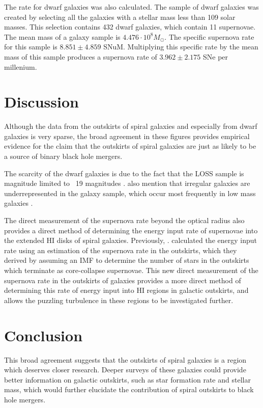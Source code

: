 \documentclass[apj]{emulateapj}
\begin{document}
The rate for dwarf galaxies was also calculated. The sample of dwarf galaxies was created by selecting all the galaxies with a stellar mass less than 109 solar masses. This selection contains 432 dwarf galaxies, which contain 11 supernovae. The mean mass of a galaxy sample is $4.476 \cdot 10^{8} M_{\odot}$. The specific supernova rate for this sample is $8.851 \pm 4.859$ SNuM. Multiplying this specific rate by the mean mass of this sample produces a supernova rate of $3.962 \pm 2.175$ SNe per millenium.

\section{Discussion}

Although the data from the outskirts of spiral galaxies and especially from dwarf galaxies is very sparse, the broad agreement in these figures provides empirical evidence for the claim that the outskirts of spiral galaxies are just as likely to be a source of binary black hole mergers.

The scarcity of the dwarf galaxies is due to the fact that the LOSS sample is magnitude limited to ~19 magnitudes \citep{Leaman11}. \citet{Leaman11} also mention that irregular galaxies are underrepresented in the galaxy sample, which occur most frequently in low mass galaxies \citep{Kelvin14}.

The direct measurement of the supernova rate beyond the optical radius also provides a direct method of determining the energy input rate of supernovae into the extended HI disks of spiral galaxies. Previously, \citet{Tamburro09}. calculated the energy input rate using an estimation of the supernova rate in the outskirts, which they derived by assuming an IMF to determine the number of stars in the outskirts which terminate as core-collapse supernovae. This new direct measurement of the supernova rate in the outskirts of galaxies provides a more direct method of determining this rate of energy input into HI regions in galactic outskirts, and allows the puzzling turbulence in these regions to be investigated further.

\section{Conclusion}

This broad agreement suggests that the outskirts of spiral galaxies is a region which deserves closer research. Deeper surveys of these galaxies could provide better information on galactic outskirts, such as star formation rate and stellar mass, which would further elucidate the contribution of spiral outskirts to black hole mergers. 
\end{document}
